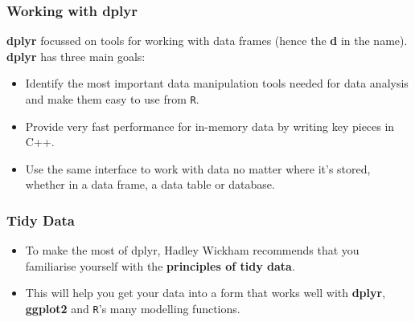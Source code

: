 \documentclass{beamer}
\begin{document}
	\begin{frame}
		
		\frametitle{Working with dplyr} \textbf{dplyr} focussed on tools for working with data frames (hence the \textbf{d} in the name). 
		\textbf{dplyr} has three main goals:
		
		\begin{itemize}
			\item Identify the most important data manipulation tools needed for data analysis and make them easy to use from \texttt{R}.
			
			\item Provide very fast performance for in-memory data by writing key pieces in C++.
			
			\item Use the same interface to work with data no matter where it's stored, whether in a data frame, a data table or database.
		\end{itemize}
	\end{frame}
	\begin{frame}
		\frametitle{Tidy Data}
		\begin{itemize}
			
			\item To make the most of dplyr, Hadley Wickham recommends that you familiarise yourself with the \textbf{principles of tidy data}. 
			\item This will help you get your data into a form that works well with \textbf{dplyr}, \textbf{ggplot2} and \texttt{R}'s many modelling functions.
		\end{itemize}
	\end{frame}
	
\end{document}
